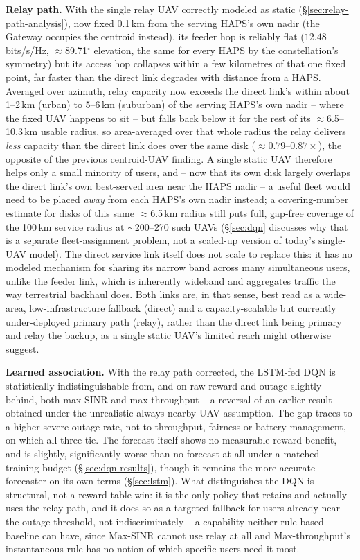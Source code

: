 \documentclass[]{ieeeaccess}
\begin{document}
\textbf{Relay path.} With the single relay UAV correctly modeled as static (\S\ref{sec:relay-path-analysis}), now fixed 0.1\,km from the serving HAPS's own nadir (the Gateway occupies the centroid instead), its feeder hop is reliably flat ($12.48$\,bits/s/Hz, $\approx$89.71$^\circ$ elevation, the same for every HAPS by the constellation's symmetry) but its access hop collapses within a few kilometres of that one fixed point, far faster than the direct link degrades with distance from a HAPS. Averaged over azimuth, relay capacity now exceeds the direct link's within about 1--2\,km (urban) to 5--6\,km (suburban) of the serving HAPS's own nadir -- where the fixed UAV happens to sit -- but falls back below it for the rest of its $\approx$6.5--10.3\,km usable radius, so area-averaged over that whole radius the relay delivers \emph{less} capacity than the direct link does over the same disk ($\approx0.79$--$0.87\times$), the opposite of the previous centroid-UAV finding. A single static UAV therefore helps only a small minority of users, and -- now that its own disk largely overlaps the direct link's own best-served area near the HAPS nadir -- a useful fleet would need to be placed \emph{away} from each HAPS's own nadir instead; a covering-number estimate for disks of this same $\approx$6.5\,km radius still puts full, gap-free coverage of the 100\,km service radius at $\sim$200--270 such UAVs (\S\ref{sec:dqn} discusses why that is a separate fleet-assignment problem, not a scaled-up version of today's single-UAV model). The direct service link itself does not scale to replace this: it has no modeled mechanism for sharing its narrow band across many simultaneous users, unlike the feeder link, which is inherently wideband and aggregates traffic the way terrestrial backhaul does. Both links are, in that sense, best read as a wide-area, low-infrastructure fallback (direct) and a capacity-scalable but currently under-deployed primary path (relay), rather than the direct link being primary and relay the backup, as a single static UAV's limited reach might otherwise suggest.

\textbf{Learned association.} With the relay path corrected, the LSTM-fed DQN is statistically indistinguishable from, and on raw reward and outage slightly behind, both max-SINR and max-throughput -- a reversal of an earlier result obtained under the unrealistic always-nearby-UAV assumption. The gap traces to a higher severe-outage rate, not to throughput, fairness or battery management, on which all three tie. The forecast itself shows no measurable reward benefit, and is slightly, significantly worse than no forecast at all under a matched training budget (\S\ref{sec:dqn-results}), though it remains the more accurate forecaster on its own terms (\S\ref{sec:lstm}). What distinguishes the DQN is structural, not a reward-table win: it is the only policy that retains and actually uses the relay path, and it does so as a targeted fallback for users already near the outage threshold, not indiscriminately -- a capability neither rule-based baseline can have, since Max-SINR cannot use relay at all and Max-throughput's instantaneous rule has no notion of which specific users need it most.
\end{document}
